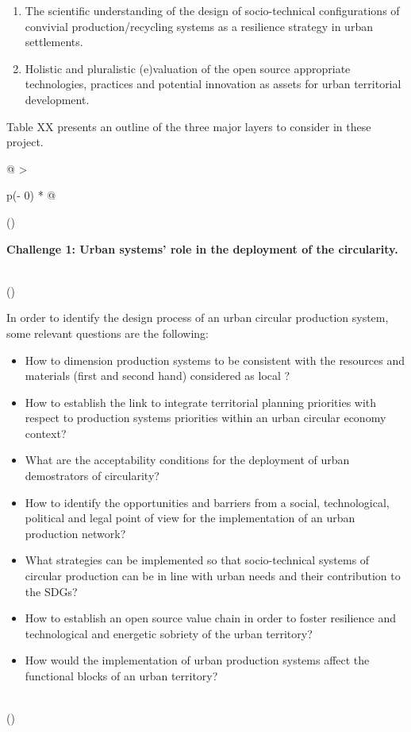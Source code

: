 \documentclass[
  12pt,
  a4paperpaper,
  onecolumn]{article}
\begin{document}
\begin{enumerate}
\def\labelenumi{\arabic{enumi})}
\item
  The scientific understanding of the design of socio-technical
  configurations of convivial production/recycling systems as a
  resilience strategy in urban settlements.
\item
  Holistic and pluralistic (e)valuation of the open source appropriate
  technologies, practices and potential innovation as assets for urban
  territorial development.
\end{enumerate}

Table XX presents an outline of the three major layers to consider in
these project.

\small

\begin{longtable}[]{@{}
  >{\raggedright\arraybackslash}p{(\columnwidth - 0\tabcolsep) * }@{}}
\toprule()
\begin{minipage}[b]{\linewidth}\raggedright
\textbf{Challenge 1: Urban systems' role in the deployment of the
circularity.}
\end{minipage} \\
\midrule()
\endhead
\begin{minipage}[t]{\linewidth}\raggedright
In order to identify the design process of an urban circular production
system, some relevant questions are the following:

\begin{itemize}
\item
  How to dimension production systems to be consistent with the
  resources and materials (first and second hand) considered as local ?
\item
  How to establish the link to integrate territorial planning priorities
  with respect to production systems priorities within an urban circular
  economy context?
\item
  What are the acceptability conditions for the deployment of urban
  demostrators of circularity?
\item
  How to identify the opportunities and barriers from a social,
  technological, political and legal point of view for the
  implementation of an urban production network?
\item
  What strategies can be implemented so that socio-technical systems of
  circular production can be in line with urban needs and their
  contribution to the SDGs?
\item
  How to establish an open source value chain in order to foster
  resilience and technological and energetic sobriety of the urban
  territory?
\item
  How would the implementation of urban production systems affect the
  functional blocks of an urban territory?
\end{itemize}
\end{minipage} \\
\bottomrule()
\end{longtable}
\end{document}
